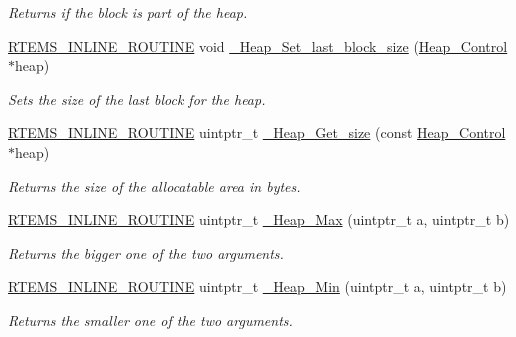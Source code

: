 \begin{DoxyCompactItemize}
\begin{DoxyCompactList}\small\item\em Returns if the block is part of the heap. \end{DoxyCompactList}\item 
\mbox{\hyperlink{group__RTEMSScoreBaseDefs_gac216239df231d5dbd15e3520b0b9313f}{R\+T\+E\+M\+S\+\_\+\+I\+N\+L\+I\+N\+E\+\_\+\+R\+O\+U\+T\+I\+NE}} void \mbox{\hyperlink{group__RTEMSScoreHeap_gaf95a9dbdca32f811e64b2bedf4f74ff3}{\+\_\+\+Heap\+\_\+\+Set\+\_\+last\+\_\+block\+\_\+size}} (\mbox{\hyperlink{structHeap__Control}{Heap\+\_\+\+Control}} $\ast$heap)
\begin{DoxyCompactList}\small\item\em Sets the size of the last block for the heap. \end{DoxyCompactList}\item 
\mbox{\hyperlink{group__RTEMSScoreBaseDefs_gac216239df231d5dbd15e3520b0b9313f}{R\+T\+E\+M\+S\+\_\+\+I\+N\+L\+I\+N\+E\+\_\+\+R\+O\+U\+T\+I\+NE}} uintptr\+\_\+t \mbox{\hyperlink{group__RTEMSScoreHeap_ga4942bc8727061905343458c29ad01282}{\+\_\+\+Heap\+\_\+\+Get\+\_\+size}} (const \mbox{\hyperlink{structHeap__Control}{Heap\+\_\+\+Control}} $\ast$heap)
\begin{DoxyCompactList}\small\item\em Returns the size of the allocatable area in bytes. \end{DoxyCompactList}\item 
\mbox{\hyperlink{group__RTEMSScoreBaseDefs_gac216239df231d5dbd15e3520b0b9313f}{R\+T\+E\+M\+S\+\_\+\+I\+N\+L\+I\+N\+E\+\_\+\+R\+O\+U\+T\+I\+NE}} uintptr\+\_\+t \mbox{\hyperlink{group__RTEMSScoreHeap_ga35ce876152e1f3a06b5caf377c92c9f3}{\+\_\+\+Heap\+\_\+\+Max}} (uintptr\+\_\+t a, uintptr\+\_\+t b)
\begin{DoxyCompactList}\small\item\em Returns the bigger one of the two arguments. \end{DoxyCompactList}\item 
\mbox{\hyperlink{group__RTEMSScoreBaseDefs_gac216239df231d5dbd15e3520b0b9313f}{R\+T\+E\+M\+S\+\_\+\+I\+N\+L\+I\+N\+E\+\_\+\+R\+O\+U\+T\+I\+NE}} uintptr\+\_\+t \mbox{\hyperlink{group__RTEMSScoreHeap_ga09fb0b895f87524b8bf4e7fe7c1b41da}{\+\_\+\+Heap\+\_\+\+Min}} (uintptr\+\_\+t a, uintptr\+\_\+t b)
\begin{DoxyCompactList}\small\item\em Returns the smaller one of the two arguments. \end{DoxyCompactList}\end{DoxyCompactItemize}


